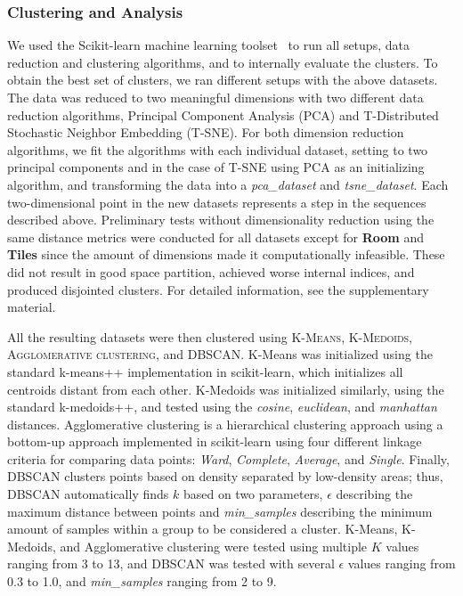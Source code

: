 \subsubsection{Clustering and Analysis}


We used the Scikit-learn machine learning toolset~\cite{p10scikit-learn} to run all setups, data reduction and clustering algorithms, and to internally evaluate the clusters. To obtain the best set of clusters, we ran different setups with the above datasets. The data was reduced to two meaningful dimensions with two different data reduction algorithms, Principal Component Analysis (PCA) and T-Distributed Stochastic Neighbor Embedding (T-SNE). For both dimension reduction algorithms, we fit the algorithms with each individual dataset, setting to two principal components and in the case of T-SNE using PCA as an initializing algorithm, and transforming the data into a \emph{pca\_dataset} and \emph{tsne\_dataset}. Each two-dimensional point in the new datasets represents a step in the sequences described above. Preliminary tests without dimensionality reduction using the same distance metrics were conducted for all datasets except for \textbf{Room} and \textbf{Tiles} since the amount of dimensions made it computationally infeasible. These did not result in good space partition, achieved worse internal indices, and produced disjointed clusters. For detailed information, see the supplementary material.  %

All the resulting datasets were then clustered using \textsc{K-Means, K-Medoids, Agglomerative clustering}, and \textsc{DBSCAN}. K-Means was initialized using the standard k-means++ implementation in scikit-learn, which initializes all centroids distant from each other. K-Medoids was initialized similarly, using the standard k-medoids++, and tested using the \emph{cosine}, \emph{euclidean}, and \emph{manhattan} distances. Agglomerative clustering is a hierarchical clustering approach using a bottom-up approach implemented in scikit-learn using four different linkage criteria for comparing data points: \emph{Ward}, \emph{Complete}, \emph{Average}, and \emph{Single}. Finally, DBSCAN clusters points based on density separated by low-density areas; thus, DBSCAN automatically finds $k$ based on two parameters, $\epsilon$ describing the maximum distance between points and \emph{min\_samples} describing the minimum amount of samples within a group to be considered a cluster. K-Means, K-Medoids, and Agglomerative clustering were tested using multiple $K$ values ranging from 3 to 13, and DBSCAN was tested with several $\epsilon$ values ranging from 0.3 to 1.0, and \emph{min\_samples} ranging from 2 to 9.

